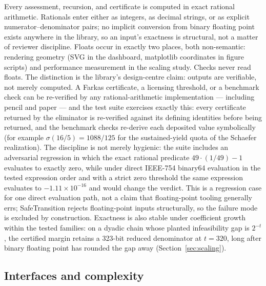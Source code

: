 \documentclass[3p,11pt]{elsarticle}
\begin{document}
Every assessment, recursion, and certificate is computed in exact rational
arithmetic. Rationals enter either as integers, as decimal strings, or as
explicit numerator--denominator pairs; no implicit conversion from binary
floating point exists anywhere in the library, so an input's exactness is
structural, not a matter of reviewer discipline. Floats occur in exactly two
places, both non-semantic: rendering geometry (SVG in the dashboard,
matplotlib coordinates in figure scripts) and performance measurement in
the scaling study. Checks never read floats. The distinction is
the library's design-centre claim: outputs are verifiable, not merely
computed. A Farkas certificate, a licensing threshold, or a benchmark check
can be re-verified by any rational-arithmetic implementation --- including
pencil and paper --- and the test suite exercises exactly this: every
certificate returned by the eliminator is re-verified against its defining
identities before being returned, and the benchmark checks re-derive each
deposited value symbolically (for example $\sigma(16/5) = 1088/125$ for the
sustained-yield quota of the Schaefer realization). The discipline is not
merely hygienic: the suite includes an adversarial regression in which
the exact rational predicate $49 \cdot (1/49) - 1$ evaluates to exactly
zero, while under direct IEEE-754 binary64 evaluation in the tested
expression order and with a strict zero threshold the same expression
evaluates to $-1.11 \times 10^{-16}$ and would change the verdict. This
is a regression case for one direct evaluation path, not a claim that
floating-point tooling generally errs; SafeTransition rejects
floating-point inputs structurally, so the failure mode is excluded by
construction. Exactness is also stable under coefficient growth within
the tested families: on a dyadic chain whose planted infeasibility gap is
$2^{-t}$, the certified margin retains a 323-bit reduced denominator at
$t = 320$, long after binary floating point has rounded the gap away
(Section~\ref{sec:scaling}).

\subsection{Interfaces and complexity}\label{sec:api}
\end{document}

